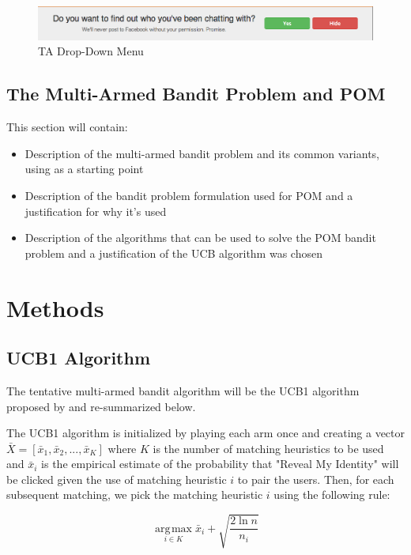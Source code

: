 \documentclass{article}
\DeclareMathOperator*{\argmax}{\arg\!\max}
\begin{document}
\begin{figure}
\centering
\includegraphics[trim= 0mm 0mm 2mm 2mm, clip, scale=0.36]{DropDownMenu}
\caption{TA Drop-Down Menu}
\label{fig:DropDownMenu}
\end{figure}

\subsection{The Multi-Armed Bandit Problem and POM}

This section will contain: 
\begin{itemize}
\item Description of the multi-armed bandit problem and its common variants, using \citet{bubeck12} as a starting point
\item Description of the bandit problem formulation used for POM and a justification for why it's used
\item Description of the algorithms that can be used to solve the POM bandit problem and a justification of the UCB algorithm was chosen
\end{itemize}

\section{Methods}

\subsection{UCB1 Algorithm}

The tentative multi-armed bandit algorithm will be the UCB1 algorithm proposed by \citep{auer02} and re-summarized below.

The UCB1 algorithm is initialized by playing each arm once and creating a vector $\bar{X} = [\bar{x}_1, \bar{x}_2, ..., \bar{x}_K]$ where $K$ is the number of matching heuristics to be used and 
$\bar{x}_i$ is the empirical estimate of the probability that "Reveal My Identity" will be clicked given the use of matching heuristic $i$ to pair the users. Then, for each subsequent matching, we pick the matching heuristic $i$ using the following rule: 

$$ \underset{i \in{K}}{\argmax{}} \bar{x}_i + \sqrt{\frac{2\ln{n}}{n_i}}$$
\end{document}
